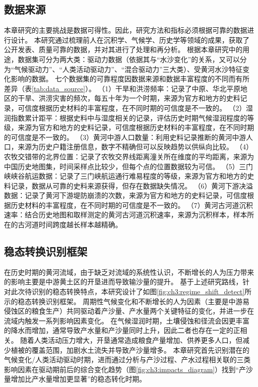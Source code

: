 \subsection{数据来源}

本章研究的主要挑战是数据可得性。因此，研究方法和指标必须根据可靠的数据进行设计。
本研究通过梳理前人在沉积学、气候学、历史学等领域的成果，获取了公开发表、质量可靠的数据，并对其进行了处理和再分析。
根据本章研究中的用途，数据集可分为两大类：驱动力数据（依据其与“水沙变化”的关系，又可以分为“气候驱动力”、“人类活动驱动力”、“混合驱动力”三大类）、受黄河水沙特征变化影响的数据。
七个数据集的可靠程度因数据来源和数据丰富程度的不同而有所差异（表\ref{tab:data_source}）。
（1）干旱和洪涝频率：记录了中原、华北平原地区的干旱、洪涝灾害的频次，每五十年为一个时期，来源为官方和地方的史料记录，可信度根据历史材料的丰富程度，在不同时期的可信度是不一致的。
（2）湿润指数累计距平：根据史料中与湿度相关的记录，评估历史时期气候湿润程度的等级，来源为官方和地方的史料记录，可信度根据历史材料的丰富程度，在不同时期的可信度是不一致的。
（3）黄河中游人口数量：利用史料记录推断的黄河中游人口，来源为历史户籍注册信息，数字不精确但可以反映趋势以供纵向比较。
（4）农牧交错带的北界位置：记录了农牧交界线距离潼关所在维度的平均距离，来源为中国历史地图集，时间采样点比较少，但每个点的位置数据较为可信。
（5）三门峡峡谷航运数据：记录了三门峡航运通行难易程度的等级，来源为官方和地方的史料记录，数据从可靠的史料来源获得，但存在数据缺失情况。
（6）黄河下游决溢数据：记录了黄河下游堤防崩溃的次数，来源为官方和地方的史料记录，可信度根据历史材料的丰富程度，在不同时期的可信度是不一致的。
（7）黄河古河道沉积速率：结合历史地图和取样测定的黄河古河道沉积速率，来源为沉积样本，样本所在的古河道时间跨度越长样本越精确。




\subsection{稳态转换识别框架}\label{sec:ch3:approach}

在历史时期的黄河流域，由于缺乏对流域的系统性认识，不断增长的人为压力带来的影响主要是中游黄土区的开垦进而导致输沙量的提升\cite{wu2020a}。
基于上述研究路线，针对此次待识别的稳态转换特点，本研究设计了如图\ref{fig:ch3:regime_shift_detect}所示的稳态转换识别框架。
周期性气候变化和不断增长的人为因素（主要是中游易侵蚀区的粮食生产）共同驱动着产沙量、产水量两个关键特征的变化，并进一步在流域内触发一系列影响因素变化。
在气候湿润时期，土壤侵蚀和径流会因更丰富的降水而增加，通常导致产水量和产沙量同时上升，因此二者也存在一定的正相关\cite{GeQuanSheng2011}。
随着人类活动压力增大，开垦通常造成粮食产量增加、供养更多人口，但减少植被的覆盖范围，加剧水土流失并导致产沙量增多\cite{wu2020a}。
本章研究首先识别潜在的气候变化/人类活动驱动时期，进而通过分析与产沙过程、产水过程相关联的三类影响因素在驱动期前后的综合变化趋势（图\ref{fig:ch3:impacts_diagram}）找到“产沙量增加比产水量增加更显著”的稳态转化时期。

